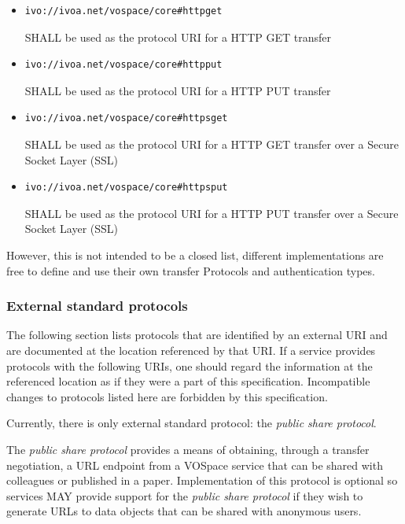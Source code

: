 \documentclass[11pt,a4paper]{ivoa}
\begin{document}
\begin{itemize}
    \item \begin{verbatim}ivo://ivoa.net/vospace/core#httpget\end{verbatim} SHALL be used as the protocol URI for a HTTP GET transfer
    \item \begin{verbatim}ivo://ivoa.net/vospace/core#httpput\end{verbatim} SHALL be used as the protocol URI for a HTTP PUT transfer
    \item \begin{verbatim}ivo://ivoa.net/vospace/core#httpsget\end{verbatim} SHALL be used as the protocol URI for a HTTP GET transfer over a Secure Socket Layer (SSL)
    \item \begin{verbatim}ivo://ivoa.net/vospace/core#httpsput\end{verbatim} SHALL be used as the protocol URI for a HTTP PUT transfer over a Secure Socket Layer (SSL)
\end{itemize}

However, this is not intended to be a closed list, different implementations are free to define and use their own transfer Protocols and authentication types.

\subsubsection{External standard protocols}
\label{subsubsec:external standard protocols}

The following section lists protocols that are identified by an external URI and are documented at the location referenced by that URI.  If a service provides protocols with the following URIs, one should regard the information at the referenced location as if they were a part of this specification.  Incompatible changes to protocols listed here are forbidden by this specification.

Currently, there is only external standard protocol: the \emph{public share protocol}.

The \emph{public share protocol} provides a means of obtaining, through a transfer negotiation, a URL endpoint from a VOSpace service that can be shared with colleagues or published in a paper.  Implementation of this protocol is optional so services MAY provide support for the \emph{public share protocol} if they wish to generate URLs to data objects that can be shared with anonymous users.
\end{document}
